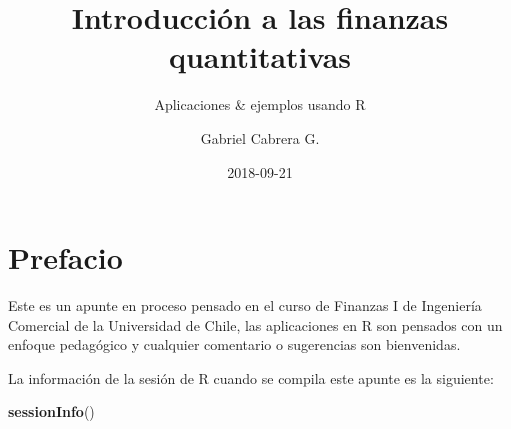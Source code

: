 \documentclass[12pt,]{book}
\title{Introducción a las finanzas quantitativas}
\subtitle{Aplicaciones \& ejemplos usando R}
\author{Gabriel Cabrera G.}
\date{2018-09-21}
\newenvironment{Shaded}{\begin{snugshade}}{\end{snugshade}}
\newcommand{\KeywordTok}[1]{\textcolor[rgb]{0.13,0.29,0.53}{\textbf{#1}}}
\newcommand{\NormalTok}[1]{#1}
\begin{document}
\maketitle

{
\hypersetup{linkcolor=black}
\setcounter{tocdepth}{2}
\tableofcontents
}
\listoftables
\listoffigures
\chapter*{Prefacio}\label{prefacio}


Este es un apunte en proceso pensado en el curso de Finanzas I de
Ingeniería Comercial de la Universidad de Chile, las aplicaciones en R
son pensados con un enfoque pedagógico y cualquier comentario o
sugerencias son bienvenidas.

La información de la sesión de R cuando se compila este apunte es la
siguiente:

\begin{Shaded}
\begin{Highlighting}[]
\KeywordTok{sessionInfo}\NormalTok{()}
\end{Highlighting}
\end{Shaded}
\end{document}
